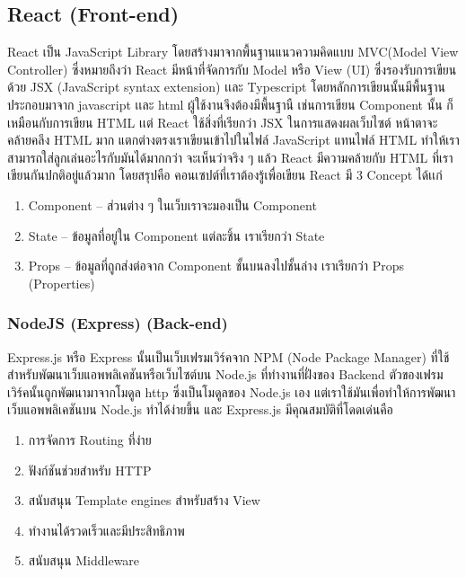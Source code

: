 \subsection{React (Front-end)}

React เป็น JavaScript Library โดยสร้างมาจากพื้นฐานแนวความคิดแบบ MVC(Model View Controller) ซึ่งหมายถึงว่า React มีหน้าที่จัดการกับ Model หรือ View (UI) ซึ่งรองรับการเขียนด้วย JSX (JavaScript syntax extension) เเละ Typescript โดยหลักการเขียนนั้นมีพื้นฐานประกอบมาจาก javascript เเละ html ผู้ใช้งานจึงต้องมีพื้นฐานื เช่นการเขียน Component นั้น ก็เหมือนกับการเขียน HTML เเต่  React ใช้สิ่งที่เรียกว่า JSX ในการแสดงผลเว็บไซต์ หน้าตาจะคล้ายคลึง HTML มาก แตกต่างตรงเราเขียนเข้าไปในไฟล์ JavaScript แทนไฟล์ HTML ทำให้เราสามารถใส่ลูกเล่นอะไรกับมันได้มากกว่า จะเห็นว่าจริง ๆ แล้ว React มีความคล้ายกับ HTML ที่เราเขียนกันปกติอยู่แล้วมาก โดยสรุปคือ คอนเซปต์ที่เราต้องรู้เพื่อเขียน React มี 3 Concept ได้เเก่


\begin{enumerate}
  \item Component – ส่วนต่าง ๆ ในเว็บเราจะมองเป็น Component
  \item State – ข้อมูลที่อยู่ใน Component แต่ละชิ้น เราเรียกว่า State
  \item Props – ข้อมูลที่ถูกส่งต่อจาก Component ชั้นบนลงไปชั้นล่าง เราเรียกว่า Props (Properties)
\end{enumerate}

\subsubsection{ NodeJS (Express) (Back-end)}

Express.js หรือ Express นั้นเป็นเว็บเฟรมเวิร์คจาก NPM (Node Package Manager) ที่ใช้สำหรับพัฒนาเว็บแอพพลิเคชันหรือเว็บไซต์บน Node.js ที่ทำงานที่ฝั่งของ Backend ตัวของเฟรมเวิร์คนั้นถูกพัฒนามาจากโมดูล http ซึ่งเป็นโมดูลของ Node.js เอง แต่เราใช้มันเพื่อทำให้การพัฒนาเว็บแอพพลิเคชันบน Node.js ทำได้ง่ายขึ้น และ Express.js มีคุณสมบัติที่โดดเด่นคือ

\begin{enumerate}
  \item การจัดการ Routing ที่ง่าย
	\item ฟังก์ชันช่วยสำหรับ HTTP
	\item สนับสนุน Template engines สำหรับสร้าง View
	\item ทำงานได้รวดเร็วและมีประสิทธิภาพ
	\item สนับสนุน Middleware
\end{enumerate}



